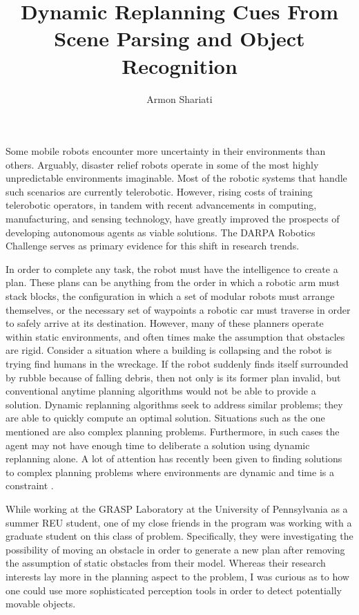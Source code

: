 \documentclass[10pt]{article}
\begin{document}
\author{Armon Shariati}
\title{Dynamic Replanning Cues From Scene Parsing and Object Recognition}
\date{}
\maketitle

Some mobile robots encounter more uncertainty in their environments than
others.  Arguably, disaster relief robots operate in some of the most highly
unpredictable environments imaginable. Most of the robotic systems that handle
such scenarios are currently telerobotic. However, rising costs of training
telerobotic operators, in tandem with recent advancements in computing,
manufacturing, and sensing technology, have greatly improved the prospects of
developing autonomous agents as viable solutions. The DARPA Robotics Challenge
serves as primary evidence for this shift in research trends.

In order to complete any task, the robot must have the intelligence to create a
plan. These plans can be anything from the order in which a robotic arm must
stack blocks, the configuration in which a set of modular robots must arrange
themselves, or the necessary set of waypoints a robotic car must traverse in
order to safely arrive at its destination. However, many of these planners
operate within static environments, and often times make the assumption that
obstacles are rigid. Consider a situation where a building is collapsing and
the robot is trying find humans in the wreckage. If the robot suddenly finds
itself surrounded by rubble because of falling debris, then not only is its
former plan invalid, but conventional anytime planning algorithms would not be
able to provide a solution. Dynamic replanning algorithms seek to address
similar problems; they are able to quickly compute an optimal solution.
Situations such as the one mentioned are also complex planning problems.
Furthermore, in such cases the agent may not have enough time to deliberate a
solution using dynamic replanning alone. A lot of attention has recently been
given to finding solutions to complex planning problems where environments are
dynamic and time is a constraint \cite{likhachev}.

While working at the GRASP Laboratory at the University of Pennsylvania as a
summer REU student, one of my close friends in the program was working with a
graduate student on this class of problem. Specifically, they were
investigating the possibility of moving an obstacle in order to generate a new
plan after removing the assumption of static obstacles from their model.
Whereas their research interests lay more in the planning aspect to the
problem, I was curious as to how one could use more sophisticated perception
tools in order to detect potentially movable objects.
\end{document}
